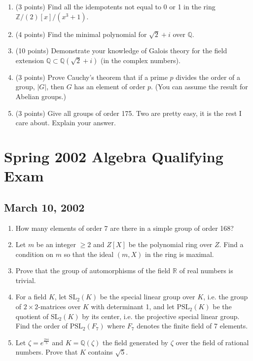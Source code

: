 \documentclass{article}
\begin{document}
\begin{enumerate}
    \item (3 points) Find all the idempotents not equal to 0 or 1 in the ring \(\mathbb{Z}/(2)[x]/(x^3 + 1)\).

    \item (4 points) Find the minimal polynomial for \(\sqrt{2} + i\) over \(\mathbb{Q}\).

    \item (10 points) Demonstrate your knowledge of Galois theory for the field extension \(\mathbb{Q} \subset \mathbb{Q}(\sqrt{2} + i)\) (in the complex numbers).

    \item (3 points) Prove Cauchy's theorem that if a prime \(p\) divides the order of a group, \(|G|\), then \(G\) has an element of order \(p\). (You can assume the result for Abelian groups.)

    \item (3 points) Give all groups of order 175. Two are pretty easy, it is the rest I care about. Explain your answer.
\end{enumerate}

\section*{Spring 2002 Algebra Qualifying Exam}
\subsection*{March 10, 2002}

\begin{enumerate}
    \item How many elements of order 7 are there in a simple group of order 168?
    
    \item Let \(m\) be an integer \(\geq 2\) and \(Z[X]\) be the polynomial ring over \(Z\). Find a condition on \(m\) so that the ideal \((m, X)\) in the ring is maximal.
    
    \item Prove that the group of automorphisms of the field \(\mathbb{R}\) of real numbers is trivial.
    
    \item For a field \(K\), let \(\text{SL}_2(K)\) be the special linear group over \(K\), i.e. the group of \(2 \times 2\)-matrices over \(K\) with determinant 1, and let \(\text{PSL}_2(K)\) be the quotient of \(\text{SL}_2(K)\) by its center, i.e. the projective special linear group. Find the order of \(\text{PSL}_2(F_7)\) where \(F_7\) denotes the finite field of 7 elements.
    
    \item Let \(\zeta = e^{\frac{2\pi i}{5}}\) and \(K = \mathbb{Q}(\zeta)\) the field generated by \(\zeta\) over the field of rational numbers. Prove that \(K\) contains \(\sqrt{5}\).
\end{enumerate}
\end{document}

